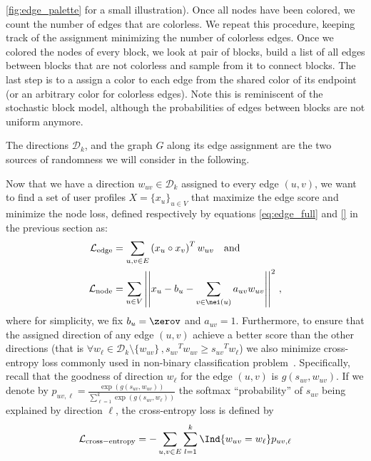 \autoref{fig:edge_palette} for a small illustration). Once all nodes have been colored, we count the
number of edges that are colorless. We repeat this procedure, keeping track of the assignment
minimizing the number of colorless edges. Once we colored the nodes of every block, we look at pair
of blocks, build a list of all edges between blocks that are not colorless and sample from it to
connect blocks. The last step is to a assign a color to each edge from the shared color of its
endpoint (or an arbitrary color for colorless edges). Note this is reminiscent of the stochastic
block model, although the probabilities of edges between blocks are not uniform anymore.

The directions $\mathcal{D}_k$, and the graph $G$ along its edge assignment are the two sources of
randomness we will consider in the following.

\bigskip

Now that we have a direction $w_{uv} \in \mathcal{D}_k$ assigned to every edge $(u,v)$, we want to
find a set of user profiles $X=\{x_u\}_{u\in V}$ that maximize the edge score and minimize the node
loss, defined respectively by equations \eqref{eq:edge_full} and \eqref{} in the
previous section as:
\begin{align*}
  \mathcal{L}_{\mathrm{edge}} &=
  \sum_{u,v \in E} \left(x_u \circ x_v\right)^T w_{uv} \quad \text{and} \\
  \mathcal{L}_{\mathrm{node}} &=
  \sum_{u\in V} \left|\left| x_u - b_u - \sum_{v \in \nei(u)} a_{uv} w_{uv} \right|\right|^2\,,
\end{align*}
where for simplicity, we fix $b_u = \zerov$ and $a_{uv} = 1$. Furthermore, to ensure that the
assigned direction of any edge $(u,v)$ achieve a better score than the other directions (that is
$\forall w_\ell \in \mathcal{D}_k \setminus \{w_{uv}\}\,, {s_{uv}}^T w_{uv} \geq  {s_{uv}}^T
w_\ell$) we also minimize cross-entropy loss commonly used in non-binary classification
problem~\autocite[Section 4.3.4]{PRML06}.  Specifically, recall that the goodness of direction
$w_\ell$ for the edge $(u,v)$ is $g(s_{uv}, w_{uv})$. If we denote by $p_{uv,\ell} = \frac{\exp
\left( g(s_{uv}, w_{uv}) \right)}{\sum_{\ell=1}^k \exp \left( g(s_{uv}, w_\ell) \right)}$ the
softmax \enquote{probability} of $s_{uv}$ being explained by direction $\ell$, the cross-entropy
loss is defined by
\begin{equation*}
  \mathcal{L}_{\mathrm{cross-entropy}} = -\sum_{u,v \in E} \sum_{l=1}^k
  \Ind{w_{uv} = w_\ell} p_{uv,\ell}
\end{equation*}


